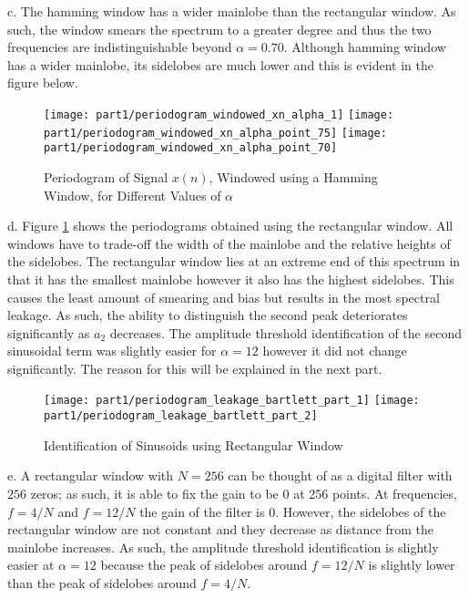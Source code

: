 \noindent{}c. The hamming window has a wider mainlobe than the rectangular window. As such, the window smears the spectrum to a greater degree and thus the two frequencies are indistinguishable beyond $\alpha=0.70$. Although hamming window has a wider mainlobe, its sidelobes are much lower and this is evident in the figure below. 

\begin{figure}[H]
\centering{}
\texttt{[image: part1/periodogram\_windowed\_xn\_alpha\_1]}
\texttt{[image: part1/periodogram\_windowed\_xn\_alpha\_point\_75]}
\texttt{[image: part1/periodogram\_windowed\_xn\_alpha\_point\_70]}
\caption{Periodogram of Signal $x(n)$, Windowed using a Hamming Window, for Different Values of $\alpha$}
\end{figure}

\noindent{}d. Figure \ref{fig:bartlett_leakage} shows the periodograms obtained using the rectangular window. All windows have to trade-off the width of the mainlobe and the relative heights of the sidelobes. The rectangular window lies at an extreme end of this spectrum in that it has the smallest mainlobe however it also has the highest sidelobes. This causes the least amount of smearing and bias but results in the most spectral leakage. As such, the ability to distinguish the second peak deteriorates significantly as $a_2$ decreases. The amplitude threshold identification of the second sinusoidal term was slightly easier for $\alpha=12$ however it did not change significantly. The reason for this will be explained in the next part.

\begin{figure}[H]
\centering{}
\texttt{[image: part1/periodogram\_leakage\_bartlett\_part\_1]}
\texttt{[image: part1/periodogram\_leakage\_bartlett\_part\_2]}
\caption{Identification of Sinusoids using Rectangular Window}
\label{fig:bartlett_leakage}
\end{figure}

\noindent{}e. A rectangular window with $N=256$ can be thought of as a digital filter with $256$ zeros; as such, it is able to fix the gain to be 0 at 256 points. At frequencies, $f=4/N$ and $f=12/N$ the gain of the filter is 0. However, the sidelobes of the rectangular window are not constant and they decrease as distance from the mainlobe increases. As such, the amplitude threshold identification is slightly easier at $\alpha=12$ because the peak of sidelobes around $f=12/N$ is slightly lower than the peak of sidelobes around $f=4/N$.

